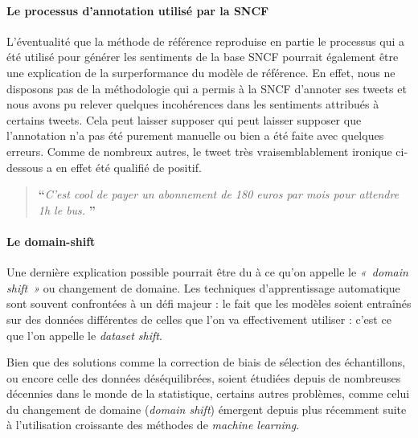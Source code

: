 \documentclass[11pt,french,french]{article}
\begin{document}
\hypertarget{le-processus-dannotation-utilisuxe9-par-la-sncf}{%
\paragraph{Le processus d'annotation utilisé par la SNCF}\label{le-processus-dannotation-utilisuxe9-par-la-sncf}}

L'éventualité que la méthode de référence reproduise en partie le processus qui a été utilisé pour générer les sentiments de la base SNCF pourrait également être une explication de la surperformance du modèle de référence.
En effet, nous ne disposons pas de la méthodologie qui a permis à la SNCF d'annoter ses tweets et nous avons pu relever quelques incohérences dans les sentiments attribués à certains tweets. Cela peut laisser supposer qui peut laisser supposer que l'annotation n'a pas été purement manuelle ou bien a été faite avec quelques erreurs.
Comme de nombreux autres, le tweet très vraisemblablement ironique ci-dessous a en effet été qualifié de positif.

\begin{quote}
\LARGE \textbf{``}\normalsize \emph{C'est cool de payer un abonnement de 180 euros par mois pour attendre 1h le bus.} \LARGE \textbf{''}\normalsize
\end{quote}

\hypertarget{le-domain-shift}{%
\paragraph{Le domain-shift}\label{le-domain-shift}}

Une dernière explication possible pourrait être du à ce qu'on appelle le \emph{« domain shift »} ou changement de domaine. Les techniques d'apprentissage automatique sont souvent confrontées à un défi majeur : le fait que les modèles soient entraînés sur des données différentes de celles que l'on va effectivement utiliser : c'est ce que l'on appelle le \emph{dataset shift}.

Bien que des solutions comme la correction de biais de sélection des échantillons, ou encore celle des données déséquilibrées, soient étudiées depuis de nombreuses décennies dans le monde de la statistique, certains autres problèmes, comme celui du changement de domaine (\emph{domain shift}) émergent depuis plus récemment suite à l'utilisation croissante des méthodes de \emph{machine learning}.
\end{document}
